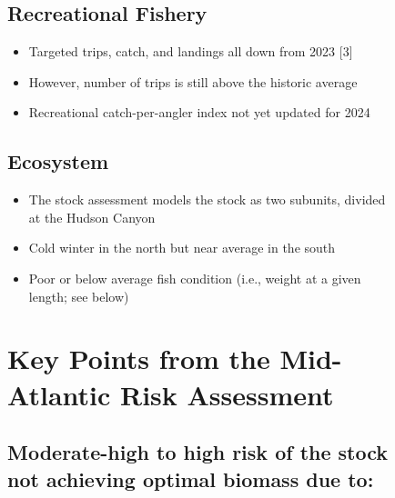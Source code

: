\documentclass[
  10pt,
  letterpaper,
  DIV=11,
  numbers=noendperiod]{scrartcl}
\providecommand{\tightlist}{%
  \setlength{\itemsep}{0pt}\setlength{\parskip}{0pt}}
\begin{document}
\begin{figure}
\begin{minipage}{0.57\linewidth}
\vspace{-0.25cm}
\subsection{Recreational Fishery}

\begin{itemize}
\tightlist
\item
  Targeted trips, catch, and landings all down from 2023 {[}3{]}
\item
  However, number of trips is still above the historic average
\item
  Recreational catch-per-angler index not yet updated for 2024
\end{itemize}

\vspace{-0.25cm}
\subsection{Ecosystem}

\begin{itemize}
\tightlist
\item
  The stock assessment models the stock as two subunits, divided at the
  Hudson Canyon
\item
  Cold winter in the north but near average in the south
\item
  Poor or below average fish condition (i.e., weight at a given length;
  see below)
\end{itemize}

\end{minipage}%
\newline
\begin{minipage}{\linewidth}

\vspace{0.25cm}
\section{Key Points from the Mid-Atlantic Risk Assessment}
\vspace{0.05cm}

\end{minipage}%
\newline
\begin{minipage}{0.57\linewidth}

\raggedright

\subsection{Moderate-high to high risk of the stock not achieving optimal biomass due to:}


\end{minipage}
\end{figure}
\end{document}
